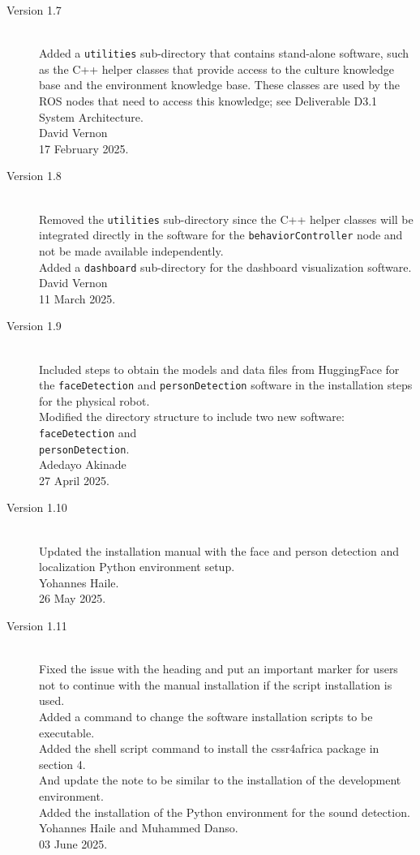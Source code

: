 \documentclass{CSSRforAfrica}
\begin{document}
{\begin{description}
\item [Version 1.7]~\\
Added a {\small \tt utilities} sub-directory that contains stand-alone software, such as the C++ helper classes that provide access to the culture knowledge base and the environment knowledge base. These classes are used by the ROS nodes that need to access this knowledge; see Deliverable D3.1 System Architecture.\\
David Vernon \\       
17 February 2025.

\item [Version 1.8]~\\
Removed the {\small \tt utilities} sub-directory since the C++ helper classes will be integrated directly in the software for the {\small \tt behaviorController} node and not be made available independently.\\
Added a  {\small \tt dashboard} sub-directory for the dashboard visualization software.\\
David Vernon \\       
11 March 2025.

\item [Version 1.9]~\\
Included steps to obtain the models and data files from HuggingFace for the \texttt{faceDetection} and \texttt{personDetection} software in the installation steps for the physical robot.\\
Modified the directory structure to include two new software: \texttt{faceDetection} and \\ \texttt{personDetection}.\\
Adedayo Akinade \\       
27 April 2025.

\item [Version 1.10]~\\
Updated the installation manual with the face and person detection and localization Python environment setup.\\
Yohannes Haile.\\    
26 May 2025.

\item [Version 1.11]~\\
Fixed the issue with the heading and put an important marker for users not to continue with the manual installation if the script installation is used. \\
Added a command to change the software installation scripts to be executable.\\
Added the shell script command to install the cssr4africa package in section 4.\\
And update the note to be similar to the installation of the development environment. \\
Added the installation of the Python environment for the sound detection. \\
Yohannes Haile and Muhammed Danso.\\
03 June 2025.


\end{description}}
\end{document}
